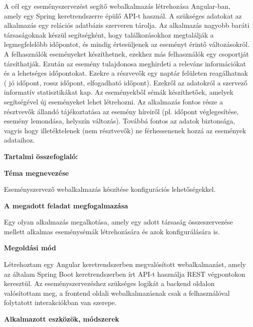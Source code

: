 \documentclass[a4paper,12pt]{report}
\theoremstyle{definition}
\theoremstyle{remark}
\begin{document}
A cél egy eseményszervezést segítő webalkalmazás létrehozása Angular-ban, amely egy Spring keretrendszerre épülő API-t használ. A szükséges adatokat az alkalmazás egy relációs adatbázis szerveren tárolja. Az alkalmazás nagyobb baráti társaságoknak készül segítségként, hogy találkozásokhoz megtalálják a legmegfelelőbb időpontot, és mindig értesüljenek az eseményt érintő változásokról. A felhasználók eseményeket készíthetnek, ezekhez más felhasználók egy csoportját társíthatják. Ezután az esemény tulajdonosa meghirdeti a releváns információkat és a lehetséges időpontokat. Ezekre a részvevők egy naptár felületen reagálhatnak ( jó időpont, rossz időpont, elfogadható időpont). Ezekről az adatokról a szervező informatív statisztikákat kap. Az eseményekből sémák készíthetőek, amelyek segítségével új eseményeket lehet létrehozni. Az alkalmazás fontos része a résztvevők állandó tájékoztatása az esemény híreiről (pl. időpont véglegesítése, esemény lemondása, helyszín változás). Továbbá fontos az adatok biztonsága, vagyis hogy illetéktelenek (nem résztvevők) ne férhessenenek hozzá az események adataihoz.

\newpage

{\Huge \bf Tartalmi összefoglaló:}

\bigskip

{\bf Téma megnevezése}

\medskip

Eseményszervező webalkalmazás készítése konfigurációs lehetőségekkel.

\bigskip

{\bf A megadott feladat megfogalmazása}

\medskip

Egy olyan alkalmazás megalkotása, amely egy adott társaság összeszervezése mellett alkalmas eseménysémák létrehozására és azok konfigurálására is.

\bigskip

{\bf Megoldási mód}

\medskip

Létrehoztam egy Angular keretrendszerben megvalósított webalkalmazást, amely az általam Spring Boot keretrendszerben írt API-t használja REST végpontokon keresztül. Az eseményszervezéshez szükséges logikát a backend oldalon valósítottam meg, a frontend oldali webalkalmazásnak csak a felhasználóval folytatott interakciókban van szerepe.

\bigskip

{\bf Alkalmazott eszközök, módszerek}

\medskip
\end{document}
